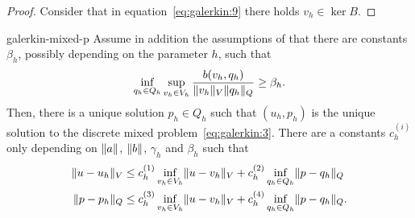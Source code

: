 \begin{proof}
  Consider that in equation~\eqref{eq:galerkin:9} there holds
  $v_h\in\ker B$.
\end{proof}

\begin{Theorem}{galerkin-mixed-p}
  Assume in addition the assumptions of
   that there are constants
  $\beta_h$, possibly depending on the parameter $h$, such that
  \begin{gather}
    \label{eq:galerkin:10}
    \inf_{q_h\in Q_h} \sup_{v_h\in V_h}
    \frac{b(v_h, q_h)}{\lVert v_h\rVert_V\lVert q_h\rVert_Q}
    \ge \beta_h.
  \end{gather}
  Then, there is a unique solution $p_h\in Q_h$ such that $(u_h, p_h)$
  is the unique solution to the discrete mixed
  problem~\eqref{eq:galerkin:3}. There are a constants $c_h^{(i)}$
  only depending on $\lVert a\rVert$, $\lVert b\rVert$, $\gamma_h$ and $\beta_h$
  such that
  \begin{align}
    \label{eq:galerkin:11}
    \lVert u-u_h\rVert_V
    &\le c_h^{(1)} \inf_{v_h\in V_h}\lVert u-v_h\rVert_V
    + c_h^{(2)} \inf_{q_h\in Q_h}\lVert p-q_h\rVert_Q \\
    \lVert p-p_h\rVert_Q
    &\le c_h^{(3)} \inf_{v_h\in V_h}\lVert u-v_h\rVert_V
    + c_h^{(4)} \inf_{q_h\in Q_h}\lVert p-q_h\rVert_Q.
  \end{align}
\end{Theorem}

